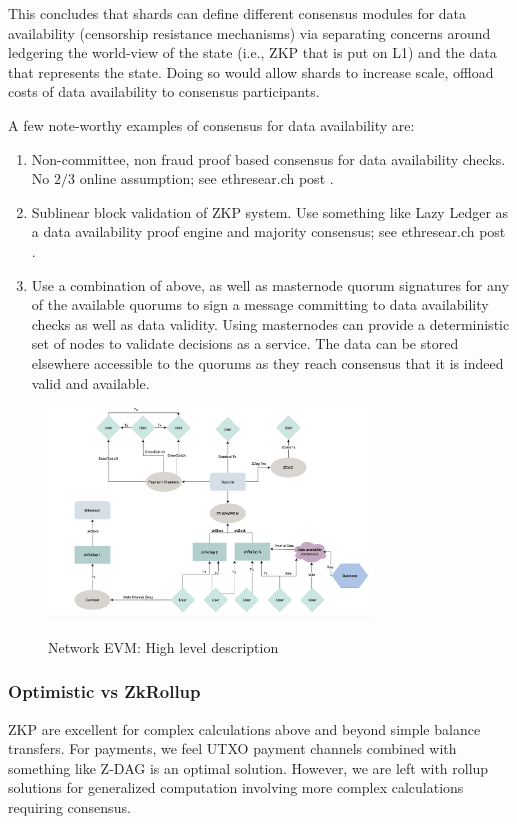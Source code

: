 \documentclass[peerreview]{ieeesyscoin}
\begin{document}
This concludes that shards can define different consensus modules for data availability (censorship resistance mechanisms) via separating concerns around ledgering the world-view of the state (i.e., ZKP that is put on L1) and the data that represents the state. Doing so would allow shards to increase scale, offload costs of data availability to consensus participants.

A few note-worthy examples of consensus for data availability are:

\begin{enumerate}
\item Non-committee, non fraud proof based consensus for data availability checks. No $2/3$ online assumption; see ethresear.ch post \cite{But20}. 
\item Sublinear block validation of ZKP system. Use something like Lazy Ledger as a data availability proof engine and majority consensus; see ethresear.ch post \cite{Al20}. 
\item Use a combination of above, as well as masternode quorum signatures for any of the available quorums to sign a message committing to data availability checks as well as data validity. Using masternodes can provide a deterministic set of nodes to validate decisions as a service. The data can be stored elsewhere accessible to the quorums as they reach consensus that it is indeed valid and available.
\end{enumerate}


\begin{figure}[h!]
\includegraphics[width=3.4in]{img/nevm.png}
\label{fig:nevm}
\caption{Network EVM: High level description} 
\end{figure} 

\subsubsection{Optimistic vs ZkRollup}

ZKP are excellent for complex calculations above and beyond simple balance transfers. For payments, we feel UTXO payment channels combined with something like Z-DAG is an optimal solution. However, we are left with rollup solutions for generalized computation involving more complex calculations requiring consensus.
\end{document}
